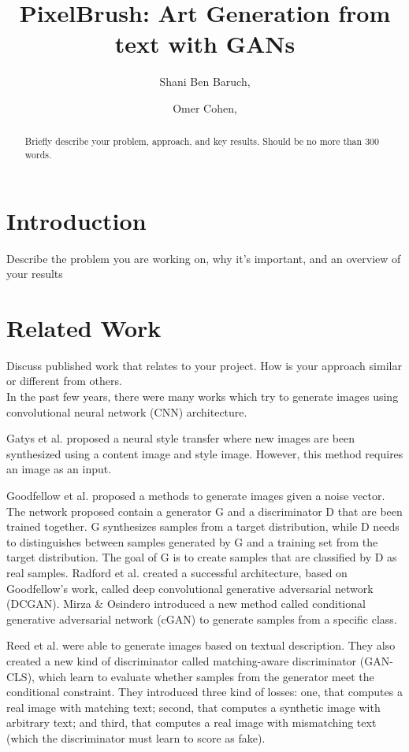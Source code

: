 \documentclass[a4paper]{article}
\title{\vspace{-2cm}PixelBrush: Art Generation from text with GANs}
\author{Shani Ben Baruch, 
\and Omer Cohen,}
\date{}
\begin{document}
\maketitle

\begin{abstract}
Briefly describe your problem, approach, and key results.
Should be no more than 300 words.
\end{abstract}


\section{Introduction}
Describe the problem you are working on, why it's
important, and an overview of your results

\section{Related Work} \label{Related_Work}
Discuss published work that relates to your
project. How is your approach similar or different from others.\\

In the past few years, there were many works which try to generate images using convolutional neural network (CNN) architecture. 

Gatys et al. \cite{gatys2016image} proposed a neural style transfer where new images are been synthesized using a content image and style image. However, this method requires an image as an input. 

Goodfellow et al. \cite{goodfellow2014generative} proposed a methods to generate images given a noise vector. The network proposed contain a generator G and a discriminator D that are been trained together. G synthesizes samples from a target distribution, while D needs to distinguishes between samples generated by G and a training set from the target distribution. The goal of G is to create samples that are classified by D as real samples. 
Radford et al. \cite{radford2015unsupervised} created a successful architecture, based on Goodfellow's work, called deep convolutional generative adversarial network (DCGAN).
Mirza \& Osindero \cite{mirza2014conditional} introduced a new method called conditional generative adversarial network (cGAN) to generate samples from a specific class.

Reed et al. \cite{reed2016generative} were able to generate images based on textual description. They also created a new kind of discriminator called matching-aware discriminator (GAN-CLS), which learn to evaluate whether samples from the generator meet the conditional constraint. They introduced three kind of losses: one, that computes a real image with matching text; second, that computes a synthetic image with arbitrary text; and third, that computes a real image with mismatching text (which the discriminator must learn to score as fake).
\end{document}
